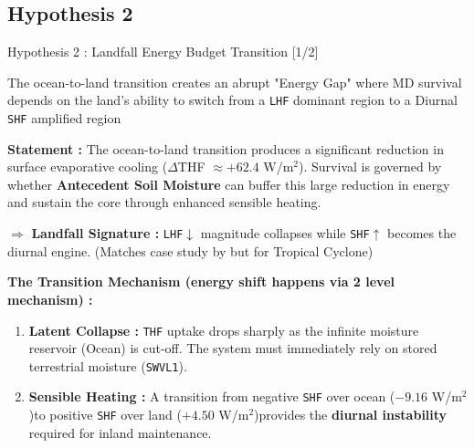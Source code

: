 \subsection{Hypothesis 2}
\begin{frame}{Hypothesis 2 : Landfall Energy Budget Transition [1/2]}
	\vspace{-0.1cm}
	\begin{block}{The ocean-to-land transition creates an abrupt "Energy Gap" where MD survival depends on the land's ability to switch from a \texttt{LHF} dominant region to a Diurnal \texttt{SHF} amplified region}\end{block}

	\vspace{0.15cm}
	\footnotesize
	\textbf{Statement :} The ocean-to-land transition produces a significant reduction in surface evaporative cooling ($\Delta$THF $\approx +62.4$ W/m$^2$)\footnotemark[7]. Survival is governed by whether \textbf{Antecedent Soil Moisture} can buffer this large reduction in energy and sustain the core through enhanced sensible heating.

	\vspace{0.2cm}
	\footnotesize
	$\Rightarrow$ \textbf{Landfall Signature :} \texttt{LHF}$\downarrow$ magnitude collapses while \texttt{SHF}$\uparrow$ becomes the diurnal engine. (Matches case study by \cite{andersen2014insights} but for Tropical Cyclone)

	\vspace{0.2cm}
	\footnotesize
	\textbf{The Transition Mechanism (energy shift happens via 2 level mechanism) :}
	\begin{enumerate}
		\item \textbf{Latent Collapse :} \texttt{THF} uptake drops sharply as the infinite moisture reservoir (Ocean) is cut-off. The system must immediately rely on stored terrestrial moisture (\texttt{SWVL1}).
		\item \textbf{Sensible Heating :} A transition from negative \texttt{SHF} over ocean ($-9.16$ W/m$^2$)\footnotemark[6] to positive \texttt{SHF} over land ($+4.50$ W/m$^2$)\footnotemark[6] provides the \textbf{diurnal instability} required for inland maintenance.
	\end{enumerate}


\end{frame}
